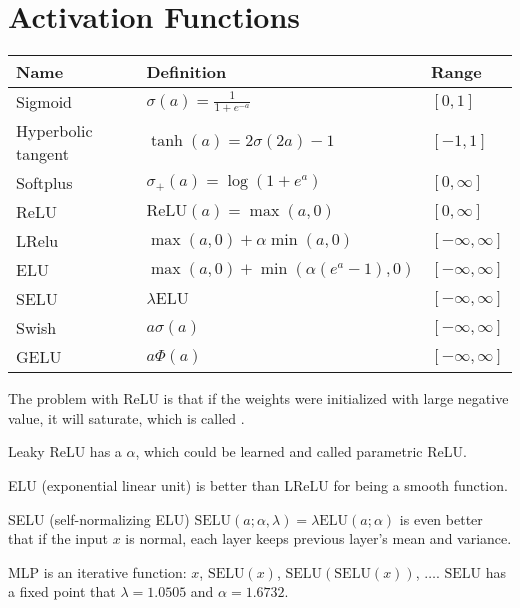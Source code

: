 
\section{Activation Functions}

\begin{table}[H]
\centering
\begin{tabular}[t]{lll}
Name & Definition & Range \\ \hline
Sigmoid & $\sigma(a) = \frac{1}{1 + e^{-a}}$ & $[0,1]$ \\
Hyperbolic tangent & $\tanh(a) = 2\sigma(2a) -1$ & $[-1,1]$ \\
Softplus & $\sigma_{+}(a) = \log(1 + e^a)$ & $[0,\infty]$ \\
ReLU & $\text{ReLU}(a) = \max(a,0)$ & $[0,\infty]$ \\
LRelu & $\max(a,0)+\alpha \min(a,0)$ & $[-\infty , \infty]$ \\
ELU & $\max(a,0) + \min(\alpha(e^a - 1), 0)$ & $[-\infty, \infty]$ \\
SELU & $\lambda \text{ELU}$ & $[-\infty, \infty]$ \\
Swish & $a\sigma(a)$ & $[-\infty,\infty]$ \\
GELU & $a \Phi(a)$ & $[-\infty,\infty]$\\
\end{tabular}
\end{table}

\begin{example}[Relu]
    The problem with ReLU is that if the weights were initialized with large negative value, it will saturate, which is called .
\end{example}

\begin{example}[LReLU]
    Leaky ReLU has a $\alpha$, which could be learned and called parametric ReLU.    
\end{example}

\begin{example}[ELU]
    ELU (exponential linear unit) is better than LReLU for being a smooth function.    
\end{example}


\begin{definition}[SELU]
    SELU (self-normalizing ELU) $\text{SELU}(a;\alpha,\lambda) = \lambda \text{ELU}(a;\alpha)$ is even better that if the input $x$ is normal, each layer keeps previous layer's mean and variance.     
    
    MLP is an iterative function: $x$, $\text{SELU}(x)$, $\text{SELU}(\text{SELU}(x))$, $\dots$. $\text{SELU}$ has a fixed point that $\lambda = 1.0505$ and $\alpha = 1.6732$. 

\end{definition}


